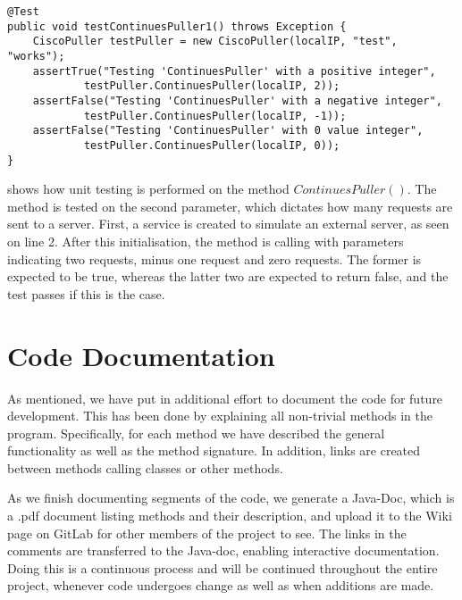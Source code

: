\begin{lstlisting}[caption={Testing ContinuesPuller},label={lst:test_continuespuller},language=inc_Java, mathescape]
@Test
public void testContinuesPuller1() throws Exception {
    CiscoPuller testPuller = new CiscoPuller(localIP, "test", "works");
    assertTrue("Testing 'ContinuesPuller' with a positive integer",
            testPuller.ContinuesPuller(localIP, 2));
    assertFalse("Testing 'ContinuesPuller' with a negative integer",
            testPuller.ContinuesPuller(localIP, -1));
    assertFalse("Testing 'ContinuesPuller' with 0 value integer",
            testPuller.ContinuesPuller(localIP, 0));
}
\end{lstlisting}
 shows how unit testing is performed on the method $ContinuesPuller()$. The method is tested on the second parameter, which dictates how many requests are sent to a server. First, a service is created to simulate an external server, as seen on line 2. After this initialisation, the method is calling with parameters indicating two requests, minus one request and zero requests. The former is expected to be true, whereas the latter two are expected to return false, and the test passes if this is the case. 

\section{Code Documentation} \label{sec:code_documentation}
As mentioned, we have put in additional effort to document the code for future development. This has been done by explaining all non-trivial methods in the program. Specifically, for each method we have described the general functionality as well as the method signature. In addition, links are created between methods calling classes or other methods. 

As we finish documenting segments of the code, we generate a Java-Doc, which is a .pdf document listing methods and their description, and upload it to the Wiki page on GitLab for other members of the project to see. The links in the comments are transferred to the Java-doc, enabling interactive documentation. 
Doing this is a continuous process and will be continued throughout the entire project, whenever code undergoes change as well as when additions are made.

